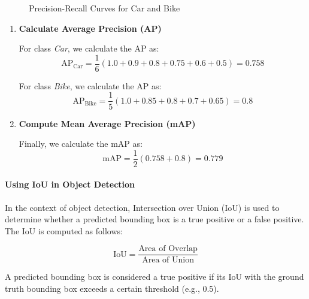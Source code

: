 \documentclass[12pt]{article}
\begin{document}
\begin{figure}[h]
  \centering
  \caption{Precision-Recall Curves for Car and Bike}
  \label{fig:pr_curve}
\end{figure}

\begin{enumerate}
  \item \textbf{Calculate Average Precision (AP)}

  For class \textit{Car}, we calculate the AP as:
  \[
  \text{AP}_{\text{Car}} = \frac{1}{6} \left(1.0 + 0.9 + 0.8 + 0.75 + 0.6 + 0.5\right) = 0.758
  \]

  For class \textit{Bike}, we calculate the AP as:
  \[
  \text{AP}_{\text{Bike}} = \frac{1}{5} \left(1.0 + 0.85 + 0.8 + 0.7 + 0.65\right) = 0.8
  \]

  \item \textbf{Compute Mean Average Precision (mAP)}

  Finally, we calculate the mAP as:
  \[
  \text{mAP} = \frac{1}{2} \left(0.758 + 0.8\right) = 0.779
  \]
\end{enumerate}

\paragraph{Using IoU in Object Detection}

In the context of object detection, Intersection over Union (IoU) is used to determine whether a predicted bounding box is a true positive or a false positive. The IoU is computed as follows:

\[
\text{IoU} = \frac{\text{Area of Overlap}}{\text{Area of Union}}
\]

A predicted bounding box is considered a true positive if its IoU with the ground truth bounding box exceeds a certain threshold (e.g., 0.5).
\end{document}
